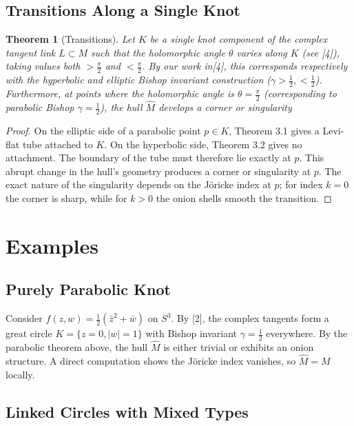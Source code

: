 \documentclass{amsart}
\newtheorem{theorem}{Theorem}
\newcommand{\hatM}{\widehat{M}}
\begin{document}
\subsection{Transitions Along a Single Knot}
\begin{theorem}[Transitions]Let $K$ be a single knot component of the complex tangent link $L\subset M$ such that the holomorphic angle $\theta$ varies along $K$ (see [4]), taking values both $> \frac{\pi}{2}$ and $< \frac{\pi}{2}$. By our work in[4], this corresponds respectively with the hyperbolic and elliptic Bishop invariant construction ($\gamma>\frac{1}{2}, <\frac{1}{2}$). Furthermore, at points where the holomorphic angle is $\theta = \frac{\pi}{2}$ (corresponding to parabolic Bishop $\gamma=\frac{1}{2}$), the hull $\hat{M}$ develops a corner or singularity\end{theorem}
\begin{proof}On the elliptic side of a parabolic point $p \in K$, Theorem 3.1 gives a Levi-flat tube attached to $K$. On the hyperbolic side, Theorem 3.2 gives no attachment. The boundary of the tube must therefore lie exactly at $p$. This abrupt change in the hull's geometry produces a corner or singularity at $p$. The exact nature of the singularity depends on the Jöricke index at $p$; for index $k = 0$ the corner is sharp, while for $k > 0$ the onion shells smooth the transition.\end{proof} 


\section{Examples}

\subsection{Purely Parabolic Knot}

Consider $f(z,w) = \frac{1}{2}(\bar{z}^2 + \bar{w})$ on $S^3$. By [2], the complex tangents form a great circle $K = \{z=0, |w|=1\}$  with Bishop invariant $\gamma = \frac{1}{2}$ everywhere. By the parabolic theorem above, the hull $\hat{M}$   is either trivial or exhibits an onion structure. A direct computation shows the Jöricke index vanishes, so $\hatM = M$ locally.

\subsection{Linked Circles with Mixed Types}
\end{document}
